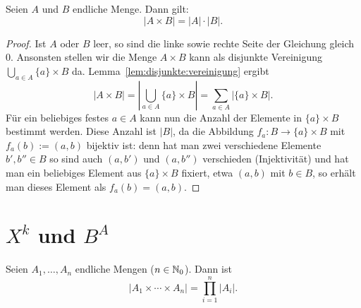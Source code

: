 \begin{lem}
	Seien $A$ und $B$ endliche Menge. Dann gilt: 
	\[
		|A \times B| = |A| \cdot |B|. 
	\]
\end{lem}
\begin{proof} 
	Ist $A$ oder $B$ leer, so sind die linke sowie rechte Seite der Gleichung gleich $0$. Ansonsten stellen wir die Menge $A \times B$ kann als disjunkte Vereinigung $\bigcup_{a \in A} \{a\} \times B$ da. Lemma~\ref{lem:disjunkte:vereinigung} ergibt
	\[
		|A \times B| = \left| \bigcup_{a \in A} \{a \} \times B \right| = \sum_{a \in A} | \{a \} \times B |.
	\]
	Für ein beliebiges festes $a \in A$ kann nun die Anzahl der Elemente in $\{a\} \times B$ bestimmt werden. Diese Anzahl ist $|B|$, da die Abbildung $f_a : B \to \{a\} \times B$ mit $f_a(b) := (a,b)$ bijektiv ist: denn hat man zwei verschiedene Elemente $b',b'' \in B$ so sind auch $(a,b')$ und $(a,b'')$ verschieden (Injektivität) und hat man ein beliebiges Element aus $\{a\} \times B$ fixiert, etwa $(a,b)$ mit $b \in B$, so erhält man dieses Element als $f_a(b) = (a,b)$. 
\end{proof} 
 

\section{$X^k$ und $B^A$} 

\begin{thm}
	Seien $A_1,\ldots, A_n$ endliche Mengen ($n \in \mathbb{N}_0$). Dann ist 
	\[
		|A_1 \times \cdots \times A_n|  = \prod_{i=1}^n |A_i|. 
	\]
\end{thm} 



